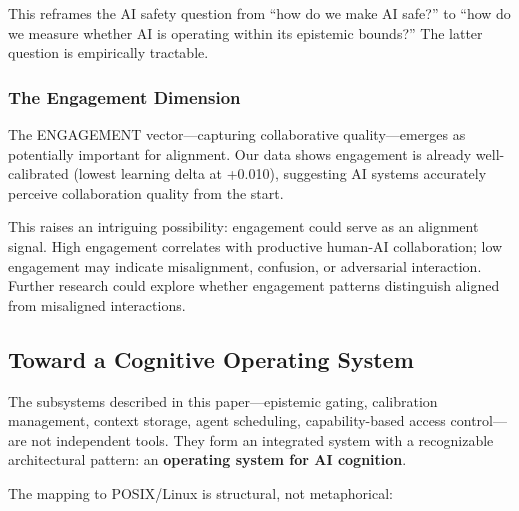 This reframes the AI safety question from ``how do we make AI safe?'' to ``how do we measure whether AI is operating within its epistemic bounds?'' The latter question is empirically tractable.

\subsubsection{The Engagement Dimension}

The ENGAGEMENT vector---capturing collaborative quality---emerges as potentially important for alignment. Our data shows engagement is already well-calibrated (lowest learning delta at +0.010), suggesting AI systems accurately perceive collaboration quality from the start.

This raises an intriguing possibility: engagement could serve as an alignment signal. High engagement correlates with productive human-AI collaboration; low engagement may indicate misalignment, confusion, or adversarial interaction. Further research could explore whether engagement patterns distinguish aligned from misaligned interactions.

\subsection{Toward a Cognitive Operating System}

The subsystems described in this paper---epistemic gating, calibration management, context storage, agent scheduling, capability-based access control---are not independent tools. They form an integrated system with a recognizable architectural pattern: an \textbf{operating system for AI cognition}.

The mapping to POSIX/Linux is structural, not metaphorical:

